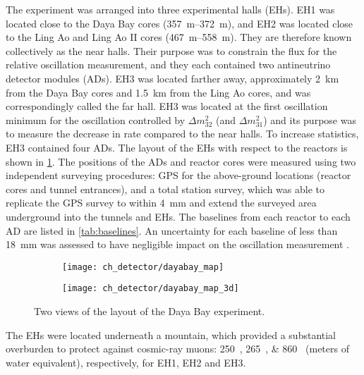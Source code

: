 The experiment was arranged into three experimental halls (EHs).
EH1 was located close to the Daya Bay cores (\SIrange{357}{372}{\meter}),
and EH2 was located close to the Ling Ao and Ling Ao II cores
(\SIrange{467}{558}{\meter}).
They are therefore known collectively as the near halls.
Their purpose was to constrain the \nuebar{} flux for the
relative oscillation measurement,
and they each contained two antineutrino detector modules (ADs).
EH3 was located farther away, approximately \SI{2}{\km} from the Daya Bay cores
and \SI{1.5}{\km} from the Ling Ao cores,
and was correspondingly called the far hall.
EH3 was located at the first oscillation minimum
for the oscillation controlled by $\Delta m^2_{32}$ (and $\Delta m^2_{31}$)
and its purpose was to measure the decrease in \nuebar{} rate compared to the near halls.
To increase statistics, EH3 contained four ADs.
The layout of the EHs with respect to the reactors is shown in \cref{fig:layout}.
The positions of the ADs and reactor cores were measured using
two independent surveying procedures: GPS for the above-ground locations
(reactor cores and tunnel entrances),
and a total station survey,
which was able to replicate the GPS survey to within \SI{4}{\mm}
and extend the surveyed area underground into the tunnels and EHs.
The baselines from each reactor to each AD are listed in \cref{tab:baselines}.
An uncertainty for each baseline of less than \SI{18}{\mm}
was assessed to have negligible impact on the oscillation measurement
\cite{detector_system}.

\begin{figure}
    \centering
    \begin{subfigure}{0.49\textwidth}
        \texttt{[image: ch\_detector/dayabay\_map]}
    \end{subfigure}
    \begin{subfigure}{0.49\textwidth}
        \texttt{[image: ch\_detector/dayabay\_map\_3d]}
    \end{subfigure}
    \caption[Daya Bay geographic layout]{Two views of the layout of the Daya Bay experiment.}
    \label{fig:layout}
\end{figure}

The EHs were located underneath a mountain, which provided a substantial
overburden to protect against cosmic-ray muons:
\SIlist{250;265;860}{\mwe} (meters of water equivalent),
respectively, for EH1, EH2 and EH3.

